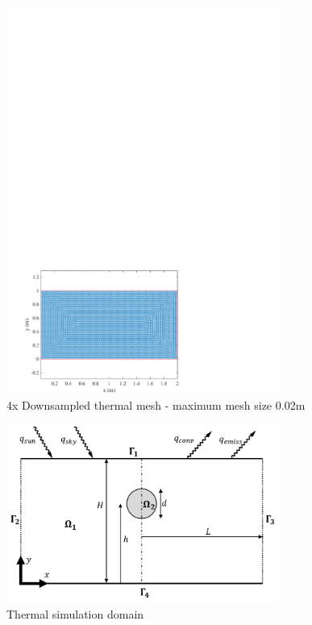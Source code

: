         \begin{figure}[htbp]
            \centering
            \includegraphics[width=0.8\textwidth]{figs/Rory/thermal_mesh.pdf}
            \caption{4x Downsampled thermal mesh - maximum mesh size 0.02m}
            \label{fig:thermal_mesh}
        \end{figure}
        
        
        
        \begin{figure}[htbp]
            \centering
            \includegraphics[width=0.8\textwidth]{figs/Rory/thermal_domain.pdf}
            \caption{Thermal simulation domain}
            \label{fig:thermal_domain}
        \end{figure}
    
